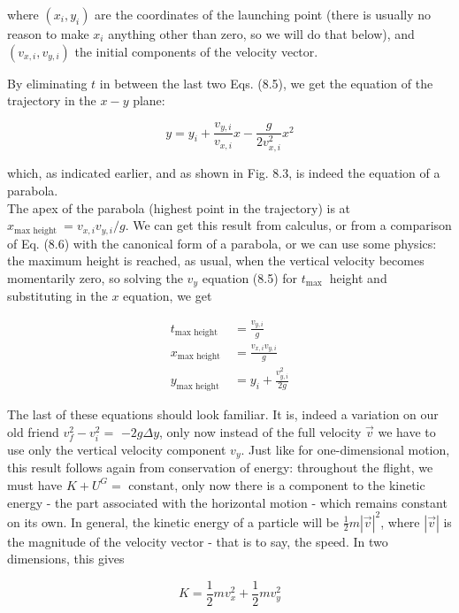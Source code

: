 \documentclass[10pt]{article}
\begin{document}
where $\left(x_{i}, y_{i}\right)$ are the coordinates of the launching point (there is usually no reason to make $x_{i}$ anything other than zero, so we will do that below), and $\left(v_{x, i}, v_{y, i}\right)$ the initial components of the velocity vector.

By eliminating $t$ in between the last two Eqs. (8.5), we get the equation of the trajectory in the $x-y$ plane:


\begin{equation*}
y=y_{i}+\frac{v_{y, i}}{v_{x, i}} x-\frac{g}{2 v_{x, i}^{2}} x^{2} \tag{8.6}
\end{equation*}


which, as indicated earlier, and as shown in Fig. 8.3, is indeed the equation of a parabola.\\
The apex of the parabola (highest point in the trajectory) is at $x_{\text {max height }}=v_{x, i} v_{y, i} / g$. We can get this result from calculus, or from a comparison of Eq. (8.6) with the canonical form of a parabola, or we can use some physics: the maximum height is reached, as usual, when the vertical velocity becomes momentarily zero, so solving the $v_{y}$ equation (8.5) for $t_{\text {max }}$ height and substituting in the $x$ equation, we get


\begin{align*}
t_{\text {max height }} & =\frac{v_{y, i}}{g} \\
x_{\text {max height }} & =\frac{v_{x, i} v_{y, i}}{g} \\
y_{\text {max height }} & =y_{i}+\frac{v_{y, i}^{2}}{2 g} \tag{8.7}
\end{align*}


The last of these equations should look familiar. It is, indeed a variation on our old friend $v_{f}^{2}-v_{i}^{2}=$ $-2 g \Delta y$, only now instead of the full velocity $\vec{v}$ we have to use only the vertical velocity component $v_{y}$. Just like for one-dimensional motion, this result follows again from conservation of energy: throughout the flight, we must have $K+U^{G}=$ constant, only now there is a component to the kinetic energy - the part associated with the horizontal motion - which remains constant on its own. In general, the kinetic energy of a particle will be $\frac{1}{2} m|\vec{v}|^{2}$, where $|\vec{v}|$ is the magnitude of the velocity vector - that is to say, the speed. In two dimensions, this gives


\begin{equation*}
K=\frac{1}{2} m v_{x}^{2}+\frac{1}{2} m v_{y}^{2} \tag{8.8}
\end{equation*}
\end{document}
